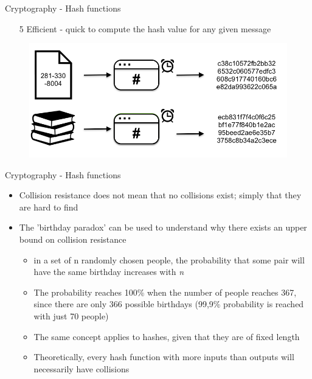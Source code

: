 \documentclass[11pt]{beamer}
\begin{document}

\begin{frame}{Cryptography - Hash functions}
	\begin{enumerate}
		\item[5] Efficient - quick to compute the hash value for any given message
	\end{enumerate}
	\begin{figure}[]
		\centering
		\includegraphics  [scale=0.3]{Images/hash5}
		\begin{centering}
		\end{centering}
	\end{figure}
\end{frame}



\begin{frame}{Cryptography - Hash functions}
	\begin{itemize}
		\item Collision resistance does not mean that no collisions exist; simply that they are hard to find
		\item The 'birthday paradox' can be used to understand why there exists an upper bound on collision resistance
		\begin{itemize}
			\item in a set of n randomly chosen people, the probability that some pair will have the same birthday increases with \textit{n}
			\item The probability reaches 100\% when the number of people reaches 367, since there are only 366 possible birthdays (99,9\% probability is reached with just 70 people)
			\item The same concept applies to hashes, given that they are of fixed length
			\item Theoretically, every hash function with more inputs than outputs will necessarily have collisions
		\end{itemize}
	\end{itemize}
\end{frame}
\end{document}
